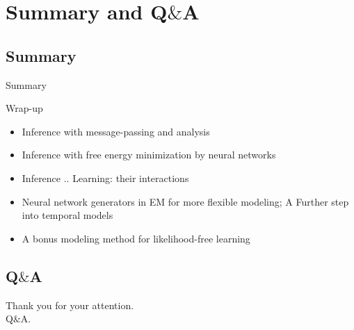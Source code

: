 
\section{Summary and Q$\&$A}
\subsection{Summary}
\begin{frame}[label=current]{Summary}
  \begin{block}{Wrap-up}
  \begin{itemize}[label=$\bullet$]
  \item Inference with message-passing and analysis
  \item Inference with free energy minimization by neural networks
  \item Inference .. Learning: their interactions
  \item Neural network generators in EM for more flexible modeling; A Further step into temporal models
  \item A bonus modeling method for likelihood-free learning
  \end{itemize}
  \end{block}
\end{frame}
\subsection{Q$\&$A}

{ 
  \begin{frame}
    \begin{center}
      {\large Thank you for your attention.}\\
      {\large Q$\&$A.}
    \end{center}
    
  \end{frame}
}



